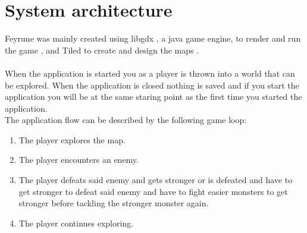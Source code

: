 \section{System architecture}
\begin{comment}
	The most overall, top level description of your application. If your application
	uses multiple components (such as servers, databases, etc.), describe their
	responsibilities here and show how they are dependent on each other and how they
	communicate (which protocols etc.)

	You will to describe the `flow' of the application at a high level. What happens
	if the application is started (and later stopped) and what the normal flow of
	operation is. Relate this to the different components (if any) in your
	application.
\end{comment}
Feyrune was mainly created using libgdx , a java game engine, to render and run the game \cite{libgdx}, and Tiled to create and design the maps \cite{tiled}. \\\\
When the application is started you as a player is thrown into a world that can be explored. When the application is closed nothing is saved and if you start the application you will be at the same staring point as the first time you started the application.\\
The application flow can be described by the following game loop:
\begin{enumerate}
	\item The player explores the map.
	\item The player encounters an enemy.
	\item The player defeats said enemy and gets stronger or is defeated and have to get stronger to defeat said enemy and have to fight easier monsters to get stronger before tackling the stronger monster again.
	\item The player continues exploring.
\end{enumerate}